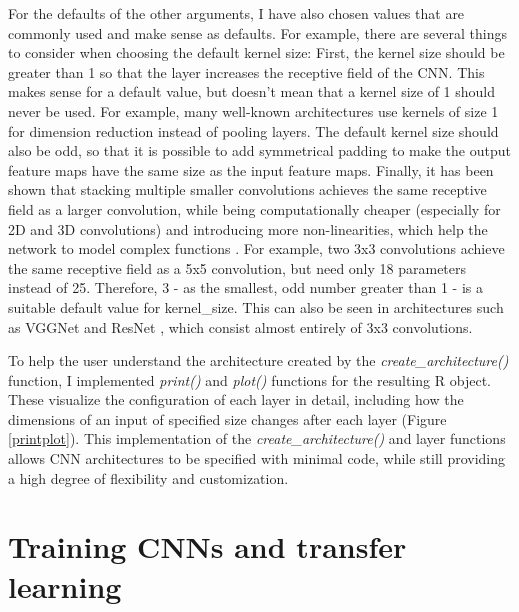 \documentclass[12pt,twoside]{scrreport}
\newcommand{\fn}[2][]{\textit{#2(}#1\textit{)}}
\begin{document}
For the defaults of the other arguments, I have also chosen values that are commonly used and make sense as defaults. For example, there are several things to consider when choosing the default kernel size: First, the kernel size should be greater than 1 so that the layer increases the receptive field of the CNN. This makes sense for a default value, but doesn't mean that a kernel size of 1 should never be used. For example, many well-known architectures use kernels of size 1 for dimension reduction instead of pooling layers. The default kernel size should also be odd, so that it is possible to add symmetrical padding to make the output feature maps have the same size as the input feature maps. Finally, it has been shown that stacking multiple smaller convolutions achieves the same receptive field as a larger convolution, while being computationally cheaper (especially for 2D and 3D convolutions) and introducing more non-linearities, which help the network to model complex functions \citep{simonyanVeryDeepConvolutional2015}. For example, two 3x3 convolutions achieve the same receptive field as a 5x5 convolution, but need only 18 parameters instead of 25. Therefore, 3 - as the smallest, odd number greater than 1 - is a suitable default value for kernel\_size. This can also be seen in architectures such as VGGNet \citep{simonyanVeryDeepConvolutional2015} and ResNet \citep{heDeepResidualLearning2015}, which consist almost entirely of 3x3 convolutions.

To help the user understand the architecture created by the \fn{create\_architecture} function, I implemented \fn{print} and \fn{plot} functions for the resulting R object. These visualize the configuration of each layer in detail, including how the dimensions of an input of specified size changes after each layer (Figure \ref{printplot}). This implementation of the \fn{create\_architecture} and layer functions allows CNN architectures to be specified with minimal code, while still providing a high degree of flexibility and customization.

\section*{Training CNNs and transfer learning}
\end{document}
